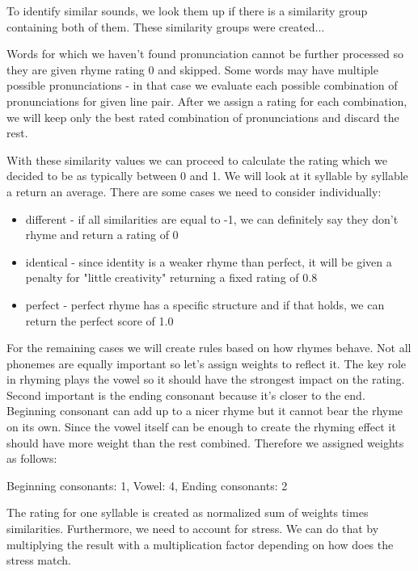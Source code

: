 To identify similar sounds, we look them up if there is a similarity group containing both of them. These similarity groups were created... 

Words for which we haven't found pronunciation cannot be further processed so they are given rhyme rating 0 and skipped. Some words may have multiple possible pronunciations - in that case we evaluate each possible combination of pronunciations for given line pair. After we assign a rating for each combination, we will keep only the best rated combination of pronunciations and discard the rest. 


With these similarity values we can proceed to calculate the rating which we decided to be as typically between 0 and 1. We will look at it syllable by syllable a return an average. There are some cases we need to consider individually:

\begin{itemize}
	\item different - if all similarities are equal to -1, we can definitely say they don't rhyme and return a rating of 0
	\item identical - since identity is a weaker rhyme than perfect, it will be given a penalty for "little creativity" returning a fixed rating of 0.8
	\item perfect - perfect rhyme has a specific structure and if that holds, we can return the perfect score of 1.0 
\end{itemize}

For the remaining cases we will create rules based on how rhymes behave. Not all phonemes are equally important so let's assign weights to reflect it. The key role in rhyming plays the vowel so it should have the strongest impact on the rating. Second important is the ending consonant because it's closer to the end. Beginning consonant can add up to a nicer rhyme but it cannot bear the rhyme on its own. Since the vowel itself can be enough to create the rhyming effect it should have more weight than the rest combined. Therefore we assigned weights as follows:

Beginning consonants: 1,
Vowel: 4,
Ending consonants: 2

The rating for one syllable is created as normalized sum of weights times similarities. Furthermore, we need to account for stress. We can do that by multiplying the result with a multiplication factor depending on how does the stress match.


